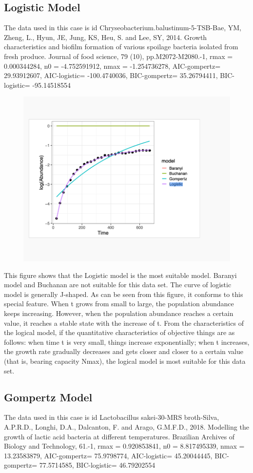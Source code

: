 \documentclass[11pt,a4 paper,title page]{article}
\begin{document}
  \subsection{Logistic Model}
  The data used in this case is id Chryseobacterium.balustinum-5-TSB-Bae, YM, Zheng, L., Hyun, JE, Jung, KS, Heu, S. and Lee, SY, 2014. Growth characteristics and biofilm formation of various spoilage bacteria isolated from fresh produce. Journal of food science, 79 (10), pp.M2072-M2080.-1, rmax = 0.000344284, n0 = -4.752591912, nmax = -1.254736278, AIC-gompertz= 29.93912607, AIC-logistic= -100.4740036, BIC-gompertz= 35.26794411, BIC-logistic= -95.14518554
\begin{figure}[H]
\centering
\includegraphics[width=.8\textwidth]{../picture/figure14.png}
\end{figure}
  \hfill\break
This figure shows that the Logistic model is the most suitable model. Baranyi model and Buchanan are not suitable for this data set. The curve of logistic model is generally J-shaped. As can be seen from this figure, it conforms to this special feature. When t grows from small to large, the population abundance keeps increasing. However, when the population abundance reaches a certain value, it reaches a stable state with the increase of t. From the characteristics of the logical model, if the quantitative characteristics of objective things are as follows: when time t is very small, things increase exponentially; when t increases, the growth rate gradually decreases and gets closer and closer to a certain value (that is, bearing capacity Nmax), the logical model is most suitable for this data set.
 \subsection{Gompertz Model}
  The data used in this case is id Lactobacillus sakei-30-MRS broth-Silva, A.P.R.D., Longhi, D.A., Dalcanton, F. and Arago, G.M.F.D., 2018. Modelling the growth of lactic acid bacteria at different temperatures. Brazilian Archives of Biology and Technology, 61.-1, rmax = 0.920853841, n0 = 8.817495339, nmax = 13.23583879, AIC-gompertz= 75.9798774, AIC-logistic= 45.20044445, BIC-gompertz= 77.5714585, BIC-logistic= 46.79202554
\end{document}
